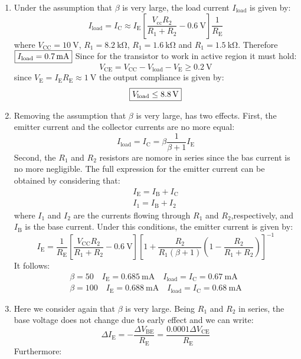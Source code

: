 \begin{enumerate}
    \item
    Under the assumption that $\beta$ is very large, the load current $I_\text{load}$ is given by:
    \[I_\text{load}=I_\text{C}\approx I_\text{E}\left[\frac{V_\text{cc}R_2}{R_1+R_2}-\SI{0.6}{\volt}\right]\frac{1}{R_\text{E}}\]
    where $V_\text{CC}=\SI{10}{\volt}$, $R_1=\SI{8.2}{\kilo\ohm}$, $R_1=\SI{1.6}{\kilo\ohm}$ and $R_1=\SI{1.5}{\kilo\ohm}$.
    Therefore $\boxed{I_\text{load}=\SI{0.7}{\milli\ampere}}$
    Since for the transistor to work in active region it must hold:
    \[V_\text{CE}=V_\text{CC}-V_\text{load}-V_\text{E}\geq\SI{0.2}{\volt}\]
    since $V_\text{E}=I_\text{E}R_\text{E}\approx\SI{1}{\volt}$ the output compliance is given by:
    \[\boxed{V_\text{load}\leq\SI{8.8}{\volt}}\]
    \item 
    Removing the assumption that $\beta$ is very large, has two effects. First, the emitter current and the collector currents are no more equal:
    \[I_\text{load}=I_\text{C}=\beta\frac{1}{\beta+1}I_\text{E}\]
    Second, the $R_1$ and $R_2$ resistors are nomore in series since the bas current is no more negligible.
    The full expression for the emitter current can be obtained by considering that:
    \begin{gather*}
        I_\text{E}=I_\text{B}+I_\text{C}\\
        I_1=I_\text{B}+I_2
    \end{gather*}
    where $I_1$ and $I_2$ are the currents flowing through $R_1$ and $R_2$,respectively, and $I_\text{B}$ is the base current. Under this conditions, the emitter current is given by:
    \[I_\text{E}=\frac{1}{R_\text{E}}\left[\frac{V_\text{CC}R_2}{R_1+R_2}-\SI{0.6}{\volt}\right]\left[1+\frac{R_2}{R_1(\beta+1)}\left(1-\frac{R_2}{R_1+R_2}\right)\right]^{-1}\]
    It follows:
    \begin{gather*}
        \beta=50 \quad I_\text{E}=\SI{0.685}{\milli\ampere} \quad I_\text{load}=I_\text{C}=\SI{0.67}{\milli\ampere}\\
        \beta=100 \quad I_\text{E}=\SI{0.688}{\milli\ampere} \quad I_\text{load}=I_\text{C}=\SI{0.68}{\milli\ampere}
    \end{gather*}
    \item 
    Here we consider again that $\beta$ is very large. Being $R_1$ and $R_2$ in series, the base voltage does not change due to early effect and we can write:
    \[\Delta I_\text{E}=-\frac{\Delta V_\text{BE}}{R_\text{E}}=\frac{0.0001\Delta V_\text{CE}}{R_\text{E}}\]
    Furthermore:

\end{enumerate}
